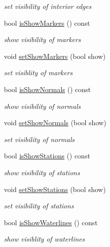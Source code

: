 \begin{DoxyCompactItemize}
\begin{DoxyCompactList}\small\item\em set visibility of interior edges \end{DoxyCompactList}\item 
bool \hyperlink{classShipCAD_1_1Visibility_adae35f2eb31f5d468674ab9856a39637}{is\+Show\+Markers} () const 
\begin{DoxyCompactList}\small\item\em show visibility of markers \end{DoxyCompactList}\item 
void \hyperlink{classShipCAD_1_1Visibility_a04cd6f732b4334070aef1f43b457d472}{set\+Show\+Markers} (bool show)
\begin{DoxyCompactList}\small\item\em set visiblity of markers \end{DoxyCompactList}\item 
bool \hyperlink{classShipCAD_1_1Visibility_a973f63d7828898c1499607a8d87b430d}{is\+Show\+Normals} () const 
\begin{DoxyCompactList}\small\item\em show visibility of normals \end{DoxyCompactList}\item 
void \hyperlink{classShipCAD_1_1Visibility_a78971bef725cdc53fa600589d68b628a}{set\+Show\+Normals} (bool show)
\begin{DoxyCompactList}\small\item\em set visibility of normals \end{DoxyCompactList}\item 
bool \hyperlink{classShipCAD_1_1Visibility_a02ae626d57305729ff870e14dd7f6e26}{is\+Show\+Stations} () const 
\begin{DoxyCompactList}\small\item\em show visibility of stations \end{DoxyCompactList}\item 
void \hyperlink{classShipCAD_1_1Visibility_a41a2754fcdbe69609b837fc9be26135e}{set\+Show\+Stations} (bool show)
\begin{DoxyCompactList}\small\item\em set visibility of stations \end{DoxyCompactList}\item 
bool \hyperlink{classShipCAD_1_1Visibility_a5ada95979a3d66b792b394f7c065b1fd}{is\+Show\+Waterlines} () const 
\begin{DoxyCompactList}\small\item\em show visiblity of waterlines \end{DoxyCompactList}\item 

\end{DoxyCompactItemize}
